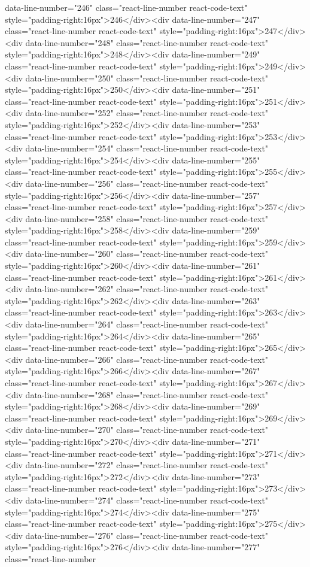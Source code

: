 data-line-number="246" class="react-line-number react-code-text" style="padding-right:16px">246</div><div data-line-number="247" class="react-line-number react-code-text" style="padding-right:16px">247</div><div data-line-number="248" class="react-line-number react-code-text" style="padding-right:16px">248</div><div data-line-number="249" class="react-line-number react-code-text" style="padding-right:16px">249</div><div data-line-number="250" class="react-line-number react-code-text" style="padding-right:16px">250</div><div data-line-number="251" class="react-line-number react-code-text" style="padding-right:16px">251</div><div data-line-number="252" class="react-line-number react-code-text" style="padding-right:16px">252</div><div data-line-number="253" class="react-line-number react-code-text" style="padding-right:16px">253</div><div data-line-number="254" class="react-line-number react-code-text" style="padding-right:16px">254</div><div data-line-number="255" class="react-line-number react-code-text" style="padding-right:16px">255</div><div data-line-number="256" class="react-line-number react-code-text" style="padding-right:16px">256</div><div data-line-number="257" class="react-line-number react-code-text" style="padding-right:16px">257</div><div data-line-number="258" class="react-line-number react-code-text" style="padding-right:16px">258</div><div data-line-number="259" class="react-line-number react-code-text" style="padding-right:16px">259</div><div data-line-number="260" class="react-line-number react-code-text" style="padding-right:16px">260</div><div data-line-number="261" class="react-line-number react-code-text" style="padding-right:16px">261</div><div data-line-number="262" class="react-line-number react-code-text" style="padding-right:16px">262</div><div data-line-number="263" class="react-line-number react-code-text" style="padding-right:16px">263</div><div data-line-number="264" class="react-line-number react-code-text" style="padding-right:16px">264</div><div data-line-number="265" class="react-line-number react-code-text" style="padding-right:16px">265</div><div data-line-number="266" class="react-line-number react-code-text" style="padding-right:16px">266</div><div data-line-number="267" class="react-line-number react-code-text" style="padding-right:16px">267</div><div data-line-number="268" class="react-line-number react-code-text" style="padding-right:16px">268</div><div data-line-number="269" class="react-line-number react-code-text" style="padding-right:16px">269</div><div data-line-number="270" class="react-line-number react-code-text" style="padding-right:16px">270</div><div data-line-number="271" class="react-line-number react-code-text" style="padding-right:16px">271</div><div data-line-number="272" class="react-line-number react-code-text" style="padding-right:16px">272</div><div data-line-number="273" class="react-line-number react-code-text" style="padding-right:16px">273</div><div data-line-number="274" class="react-line-number react-code-text" style="padding-right:16px">274</div><div data-line-number="275" class="react-line-number react-code-text" style="padding-right:16px">275</div><div data-line-number="276" class="react-line-number react-code-text" style="padding-right:16px">276</div><div data-line-number="277" class="react-line-number 